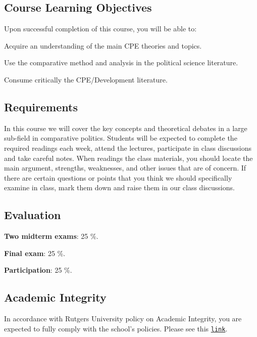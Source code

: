 \documentclass[letterpaper]{article}
\renewenvironment{itemize}{
  \begin{list}{}{
    \setlength{\leftmargin}{1.5em}
  }
}{
  \end{list}
}
\begin{document}
\subsection*{Course Learning Objectives}
 
Upon successful completion of this course, you will be able to:

\begin{itemize}
	\item[$\bullet$] Acquire an understanding of the main CPE theories and topics.
	\item[$\bullet$] Use the comparative method and analysis in the political science literature.
	\item[$\bullet$] Consume critically the CPE/Development literature.
\end{itemize}



\subsection*{Requirements}

In this course we will cover the key concepts and theoretical debates in a large sub-field in comparative politics. Students will be expected to complete the required readings each week, attend the lectures, participate in class discussions and take careful notes. When readings the class materials, you should locate the main argument, strengths, weaknesses, and other issues that are of concern. If there are certain questions or points that you think we should specifically examine in class, mark them down and raise them in our class discussions.

\subsection*{Evaluation}


\begin{itemize}
	\item[$\bullet$] {\bf Two midterm exams}: 25 \%.
	\item[$\bullet$] {\bf Final exam}: 25 \%.
	\item[$\bullet$] {\bf Participation}: 25 \%.
\end{itemize}


\subsection*{Academic Integrity}
In accordance with Rutgers University policy on Academic Integrity, you are expected to fully comply with the school’s policies.  Please see this \href{http://academicintegrity.rutgers.edu}{\texttt{link}}.
\end{document}
